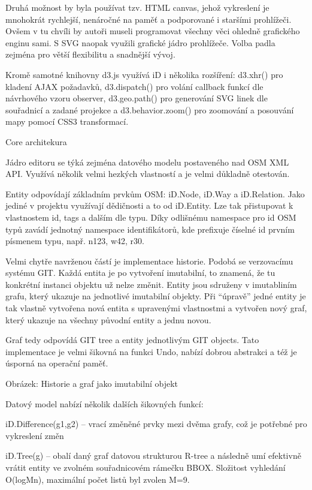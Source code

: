 Druhá možnost by byla používat tzv. HTML canvas, jehož vykreslení je mnohokrát rychlejší, nenáročné na paměť a podporované i staršími prohlížeči. Ovšem v tu chvíli by autoři museli programovat všechny věci ohledně grafického enginu sami. S SVG naopak využili grafické jádro prohlížeče. Volba padla zejména pro větší flexibilitu a snadnější vývoj.

Kromě samotné knihovny d3.js využívá iD i několika rozšíření: d3.xhr() pro kladení AJAX požadavků, d3.dispatch() pro volání callback funkcí dle návrhového vzoru observer, d3.geo.path() pro generování SVG linek dle souřadnicí a zadané projekce a d3.behavior.zoom() pro zoomování a posouvání mapy pomocí CSS3 transformací.

Core architekura



Jádro editoru se týká zejména datového modelu postaveného nad OSM XML API. Využívá několik velmi hezkých vlastností a je velmi důkladně otestován.

Entity odpovídají základním prvkům OSM: iD.Node, iD.Way a iD.Relation. Jako jediné v projektu využívají dědičnosti a to od iD.Entity. Lze tak přistupovat k vlastnostem id, tags a dalším dle typu. Díky odlišnému namespace pro id OSM typů zavádí jednotný namespace identifikátorů, kde prefixuje číselné id prvním písmenem typu, např. n123, w42, r30.

Velmi chytře navrženou částí je implementace historie. Podobá se verzovacímu systému GIT. Každá entita je po vytvoření imutabilní, to znamená, že tu konkrétní instanci objektu už nelze změnit. Entity jsou sdruženy v imutabliním grafu, který ukazuje na jednotlivé imutabilní objekty. Při “úpravě” jedné entity je tak vlastně vytvořena nová entita s upravenými vlastnostmi a vytvořen nový graf, který ukazuje na všechny původní entity a jednu novou.

Graf tedy odpovídá GIT tree a entity jednotlivým GIT objects. Tato implementace je velmi šikovná na funkci Undo, nabízí dobrou abstrakci a též je úsporná na operační paměť.



Obrázek: Historie a graf jako imutabilní objekt

Datový model nabízí několik dalších šikovných funkcí:

iD.Difference(g1,g2) – vrací změněné prvky mezi dvěma grafy, což je potřebné pro vykreslení změn

iD.Tree(g) – obalí daný graf datovou strukturou R-tree a následně umí efektivně vrátit entity ve zvolném souřadnicovém rámečku BBOX. Složitost vyhledání O(logMn), maximální počet listů byl zvolen M=9. 

